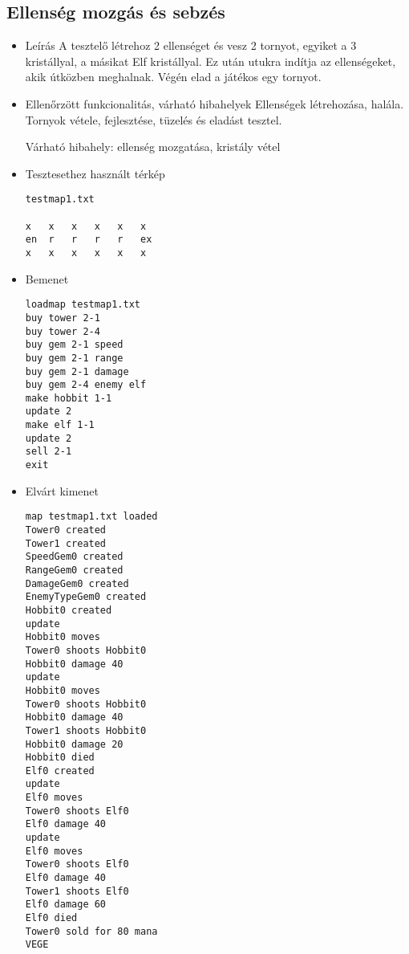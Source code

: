 \subsection{Ellenség mozgás és sebzés}
\begin{itemize}
\item Leírás\newline
A tesztelő létrehoz 2 ellenséget és vesz 2 tornyot, egyiket a 3 kristállyal, a másikat Elf kristállyal. Ez után utukra indítja az ellenségeket, akik útközben meghalnak. Végén elad a játékos egy tornyot.
\item Ellenőrzött funkcionalitás, várható hibahelyek \newline
Ellenségek létrehozása, halála. Tornyok vétele, fejlesztése, tüzelés és eladást tesztel. 

Várható hibahely: ellenség mozgatása, kristály vétel
\item Tesztesethez használt térkép \newline
\begin{lstlisting}
testmap1.txt

x	x	x	x	x	x
en	r	r	r	r	ex
x	x	x	x	x	x
\end{lstlisting}

\item Bemenet\newline
\begin{lstlisting}
loadmap testmap1.txt
buy tower 2-1
buy tower 2-4
buy gem 2-1 speed
buy gem 2-1 range
buy gem 2-1 damage
buy gem 2-4 enemy elf
make hobbit 1-1
update 2
make elf 1-1
update 2
sell 2-1
exit
\end{lstlisting}
\item Elvárt kimenet\newline
\begin{lstlisting}
map testmap1.txt loaded
Tower0 created
Tower1 created
SpeedGem0 created
RangeGem0 created
DamageGem0 created
EnemyTypeGem0 created
Hobbit0 created
update
Hobbit0 moves
Tower0 shoots Hobbit0
Hobbit0 damage 40
update
Hobbit0 moves
Tower0 shoots Hobbit0
Hobbit0 damage 40
Tower1 shoots Hobbit0
Hobbit0 damage 20
Hobbit0 died
Elf0 created
update
Elf0 moves
Tower0 shoots Elf0
Elf0 damage 40
update
Elf0 moves
Tower0 shoots Elf0
Elf0 damage 40
Tower1 shoots Elf0
Elf0 damage 60
Elf0 died
Tower0 sold for 80 mana
VEGE
\end{lstlisting}
\end{itemize}

